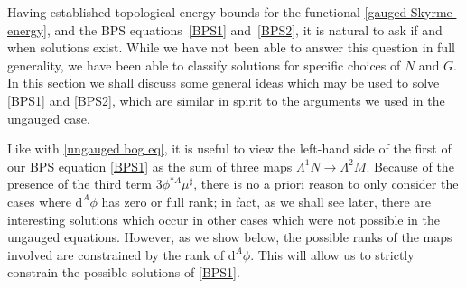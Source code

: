 \documentclass[10pt,a4paper]{amsart}
\newcommand{\1}{{\mathbb{1}}}
\def \d{\mathrm{d}}
\numberwithin{equation}{section}
\begin{document}
Having established topological energy bounds for the functional \eqref{gauged-Skyrme-energy}, and the BPS equations~\eqref{BPS1} and~\eqref{BPS2}, it is natural to ask if and when solutions exist. While we have not been able to answer this question in full generality, we have been able to classify solutions for specific choices of $N$ and $G$. In this section we shall discuss some general ideas which may be used to solve \eqref{BPS1} and \eqref{BPS2}, which are similar in spirit to the arguments we used in the ungauged case.

Like with \eqref{ungauged bog eq}, it is useful to view the left-hand side of the first of our BPS equation \eqref{BPS1} as the sum of three maps $\Lambda^1N\to\Lambda^2M$. Because of the presence of the third term $3\phi^{\ast A}\mu^\sharp$, there is no a priori reason to only consider the cases where $\d^A\phi$ has zero or full rank; in fact, as we shall see later, there are interesting solutions which occur in other cases which were not possible in the ungauged equations. However, as we show below, the possible ranks of the maps involved are constrained by the rank of $\d^A\phi$. This will allow us to strictly constrain the possible solutions of \eqref{BPS1}.
\end{document}

